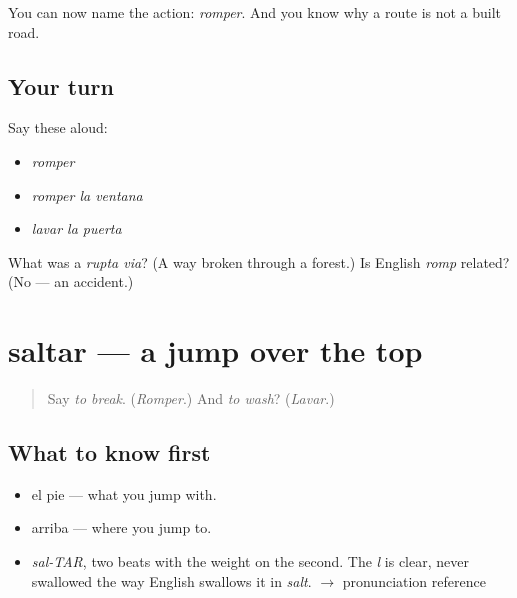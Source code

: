\begin{grammarlens}[title={What you've built}]
You can now name the action: \emph{romper}. And you know why a route is not a built road.
\end{grammarlens}

\subsection*{Your turn}
Say these aloud:

\begin{itemize}
\raggedright
  \item \emph{romper}
  \item \emph{romper la ventana}
  \item \emph{lavar la puerta}
\end{itemize}

\begin{tcolorbox}[breakable,colback=teal!4,colframe=teal!35!black,title={Before you move on}]
What was a \emph{rupta via}? (A way broken through a forest.) Is English \emph{romp} related? (No — an accident.)
\end{tcolorbox}
\section[saltar]{saltar — a jump over the top}

\label{lesson:ES-C381-saltar}



\begin{quote}
Say \emph{to break}. (\emph{Romper}.) And \emph{to wash}? (\emph{Lavar}.)
\end{quote}

\subsection*{What to know first}
\begin{itemize}
\raggedright
  \item el pie — what you jump with.
  \item arriba — where you jump to.
\end{itemize}

\begin{sounds}
\begin{itemize}
\raggedright
  \item \emph{sal-TAR}, two beats with the weight on the second. The \emph{l} is clear, never swallowed the way English swallows it in \emph{salt}. $\to$ pronunciation reference
\end{itemize}
\end{sounds}

